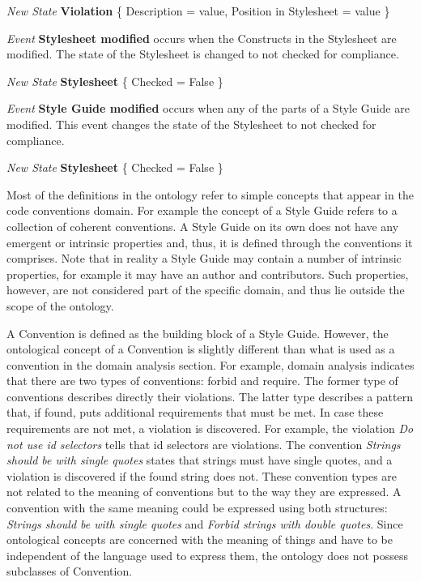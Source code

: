 \begin{description}
\textit{New State} \textbf{Violation} \{ Description = value, Position in Stylesheet = value \}


\item\textit{Event} \textbf{Stylesheet modified} occurs when the Constructs in the Stylesheet are modified. The state of the Stylesheet is changed to not checked for compliance.

\textit{New State} \textbf{Stylesheet} \{ Checked = False \}


\item\textit{Event} \textbf{Style Guide modified} occurs when any of the parts of a Style Guide are modified. This event changes the state of the Stylesheet to not checked for compliance.

\textit{New State} \textbf{Stylesheet} \{ Checked = False \}

\end{description}


Most of the definitions in the ontology refer to simple concepts that appear in the code conventions
domain. For example the concept of a Style Guide refers to a collection of coherent conventions. A
Style Guide on its own does not have any emergent or intrinsic properties and, thus, it is defined
through the conventions it comprises. Note that in reality a Style Guide may contain a number of
intrinsic properties, for example it may have an author and contributors. Such
properties, however, are not considered part of the specific domain, and thus lie outside the scope
of the ontology.

A Convention is defined as the building block of a Style Guide. However, the ontological concept of
a Convention is slightly different than what is used as a convention in the domain analysis section.
For example, domain analysis indicates that there are two types of conventions: forbid and require.
The former type of conventions describes directly their violations. The latter type describes a
pattern that, if found, puts additional requirements that must be met. In case these requirements
are not met, a violation is discovered. For example, the violation \textit{Do not use id selectors}
tells that id selectors are violations. The convention \textit{Strings should be with single quotes}
states that strings must have single quotes, and a violation is discovered if the found string does
not. These convention types are not related to the meaning of conventions but to the way they are
expressed. A convention with the same meaning could be expressed using both structures:
\textit{Strings should be with single quotes} and \textit{Forbid strings with double quotes}. Since
ontological concepts are concerned with the meaning of things and have to be independent of the
language used to express them, the ontology does not possess subclasses of Convention.


